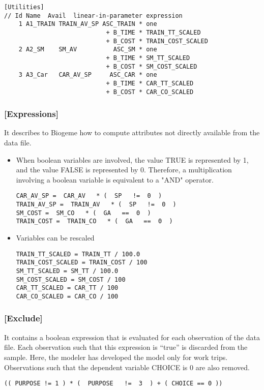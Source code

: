 \documentclass[12pt]{memoir}
\begin{document}
{\footnotesize
\begin{verbatim}
[Utilities]
// Id Name  Avail  linear-in-parameter expression
    1 A1_TRAIN TRAIN_AV_SP ASC_TRAIN * one 
                            + B_TIME * TRAIN_TT_SCALED 
                            + B_COST * TRAIN_COST_SCALED
    2 A2_SM    SM_AV          ASC_SM * one
                            + B_TIME * SM_TT_SCALED
                            + B_COST * SM_COST_SCALED
    3 A3_Car   CAR_AV_SP     ASC_CAR * one 
                            + B_TIME * CAR_TT_SCALED
                            + B_COST * CAR_CO_SCALED
\end{verbatim}
}

\subsubsection{[Expressions]}
It describes to Biogeme how to
compute attributes not directly available from the data file. 
\begin{itemize}
\item  When boolean variables are involved, the value TRUE is represented by 1, and the value FALSE is represented by 0. Therefore, a multiplication involving a boolean variable is equivalent to a "AND" operator.
{\footnotesize
\begin{verbatim}
CAR_AV_SP =  CAR_AV   * (  SP   !=  0  )
TRAIN_AV_SP =  TRAIN_AV   * (  SP   !=  0  )
SM_COST =  SM_CO   * (  GA   ==  0  ) 
TRAIN_COST =  TRAIN_CO   * (  GA   ==  0  )
\end{verbatim}
}
\item  Variables can be rescaled
{\footnotesize
\begin{verbatim}
TRAIN_TT_SCALED = TRAIN_TT / 100.0
TRAIN_COST_SCALED = TRAIN_COST / 100
SM_TT_SCALED = SM_TT / 100.0
SM_COST_SCALED = SM_COST / 100
CAR_TT_SCALED = CAR_TT / 100
CAR_CO_SCALED = CAR_CO / 100
\end{verbatim}
}

\end{itemize}

\subsubsection{[Exclude]}
It contains a boolean expression that is evaluated for each observation of the data file.  Each observation such that this expression is ``true'' is discarded from the sample. Here, the modeler  has developed the model only for work trips.  
Observations such that the dependent variable CHOICE is 0 are also removed.
{\footnotesize
\begin{verbatim}
(( PURPOSE != 1 ) * (  PURPOSE   !=  3  ) + ( CHOICE == 0 )) 
\end{verbatim}
}
\end{document}
